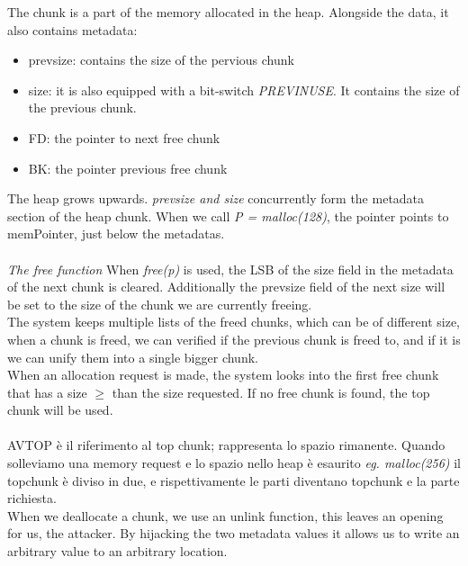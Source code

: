 \documentclass[11pt, oneside]{article}   	%
\begin{document}
The chunk is a part of the memory allocated in the heap. Alongside the data, it also contains metadata:
\begin{itemize}
\item prev\textunderscore size: contains the size of the pervious chunk 
\item size: it is also equipped with a bit-switch \emph{PREV\textunderscore INUSE}.
It contains the size of the previous chunk.
\item FD: the pointer to next free chunk
\item BK: the pointer previous free chunk
\end{itemize}

The heap grows upwards.
\emph{prev\textunderscore size and size} concurrently form the metadata section of the heap chunk.
When we call \emph{P = malloc(128)}, the pointer points to memPointer, just below the metadatas.\\\\
\emph{The free function}
When \emph{free(p)} is used, the LSB of the size field in the metadata of the next chunk is cleared. Additionally the prev\textunderscore size field of the next size will be set to the size of the chunk we are currently freeing. \\
The system keeps multiple lists of the freed chunks, which can be of different size, when a chunk is freed, we can verified if the previous chunk is freed to, and if it is we can unify them into a single bigger chunk.\\
When an allocation request is made, the system looks into the first free chunk that has a size \(\geq\) than the size requested. If no free chunk is found, the top chunk will be used.\\\\
AV\textunderscore TOP è il riferimento al top chunk; rappresenta lo spazio rimanente. Quando solleviamo una memory request e lo spazio nello heap è esaurito \emph{eg. malloc(256)} il topchunk è diviso in due, e rispettivamente le parti diventano topchunk e la parte richiesta.\\
When we deallocate a chunk, we use an unlink function, this leaves an opening for us, the attacker. By hijacking the two metadata values it allows us to write an arbitrary value to an arbitrary location.
\end{document}
